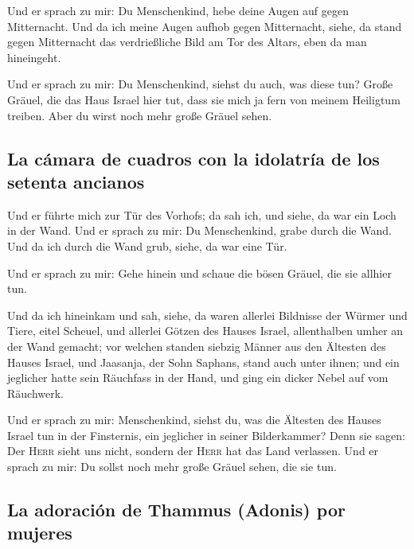  Und er sprach zu mir: Du Menschenkind, hebe deine Augen
auf gegen Mitternacht. Und da ich meine Augen aufhob gegen Mitternacht,
siehe, da stand gegen Mitternacht das verdrießliche Bild am Tor des
Altars, eben da man hineingeht.

 Und er sprach zu mir: Du Menschenkind, siehst du auch,
was diese tun? Große Gräuel, die das Haus Israel hier tut, dass sie mich
ja fern von meinem Heiligtum treiben. Aber du wirst noch mehr große
Gräuel sehen.

\hypertarget{la-cuxe1mara-de-cuadros-con-la-idolatruxeda-de-los-setenta-ancianos}{%
\subsection{La cámara de cuadros con la idolatría de los setenta
ancianos}\label{la-cuxe1mara-de-cuadros-con-la-idolatruxeda-de-los-setenta-ancianos}}

 Und er führte mich zur Tür des Vorhofs; da sah ich, und
siehe, da war ein Loch in der Wand.  Und er sprach zu mir:
Du Menschenkind, grabe durch die Wand. Und da ich durch die Wand grub,
siehe, da war eine Tür.

 Und er sprach zu mir: Gehe hinein und schaue die bösen
Gräuel, die sie allhier tun.

 Und da ich hineinkam und sah, siehe, da waren allerlei
Bildnisse der Würmer und Tiere, eitel Scheuel, und allerlei Götzen des
Hauses Israel, allenthalben umher an der Wand gemacht; 
vor welchen standen siebzig Männer aus den Ältesten des Hauses Israel,
und Jaasanja, der Sohn Saphans, stand auch unter ihnen; und ein
jeglicher hatte sein Räuchfass in der Hand, und ging ein dicker Nebel
auf vom Räuchwerk.

 Und er sprach zu mir: Menschenkind, siehst du, was die
Ältesten des Hauses Israel tun in der Finsternis, ein jeglicher in
seiner Bilderkammer? Denn sie sagen: Der \textsc{Herr} sieht uns nicht,
sondern der \textsc{Herr} hat das Land verlassen.  Und er
sprach zu mir: Du sollst noch mehr große Gräuel sehen, die sie tun.

\hypertarget{la-adoraciuxf3n-de-thammus-adonis-por-mujeres}{%
\subsection{La adoración de Thammus (Adonis) por
mujeres}\label{la-adoraciuxf3n-de-thammus-adonis-por-mujeres}}

